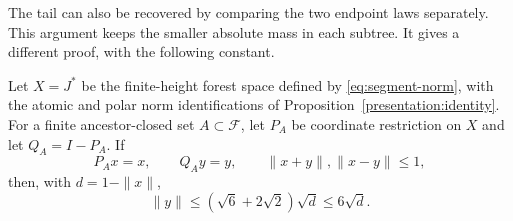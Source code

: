 The tail can also be recovered by comparing the two endpoint laws
separately. This argument keeps the smaller absolute mass in each
subtree. It gives a different proof, with the following constant.

\begin{proposition}\label{molx:minimum-tail}
Let $X=J^*$ be the finite-height forest space defined by
\eqref{eq:segment-norm}, with the atomic and polar norm identifications
of Proposition~\ref{presentation:identity}. For a finite ancestor-closed
set $A\subset\mathcal F$, let $P_A$ be coordinate restriction on $X$
and let $Q_A=I-P_A$.
If
\[
 P_Ax=x,\qquad Q_Ay=y,\qquad \|x+y\|,\|x-y\|\le1,
\]
then, with $d=1-\|x\|$,
\begin{equation}\label{molx:minimum-conclusion}
 \|y\|\le(\sqrt6+2\sqrt2)\sqrt d\le6\sqrt d.
\end{equation}
\end{proposition}

